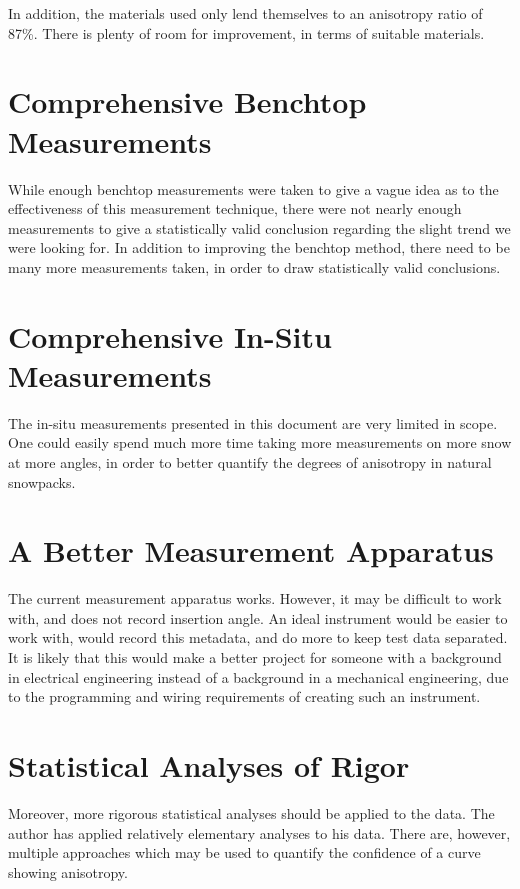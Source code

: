 In addition, the materials used only lend themselves to an anisotropy ratio of
87\%. There is plenty of room for improvement, in terms of suitable materials.

\section{Comprehensive Benchtop Measurements}

While enough benchtop measurements were taken to give a vague idea as to the
effectiveness of this measurement technique, there were not nearly enough
measurements to give a statistically valid conclusion regarding the slight
trend we were looking for. In addition to improving the benchtop method, there
need to be many more measurements taken, in order to draw statistically valid
conclusions.

\section{Comprehensive In-Situ Measurements}

The in-situ measurements presented in this document are very limited in scope.
One could easily spend much more time taking more measurements on more snow at
more angles, in order to better quantify the degrees of anisotropy in natural
snowpacks.

\section{A Better Measurement Apparatus}

The current measurement apparatus works. However, it may be difficult to work
with, and does not record insertion angle. An ideal instrument would be easier
to work with, would record this metadata, and do more to keep test data
separated. It is likely that this would make a better project for someone with a
background in electrical engineering instead of a background in a mechanical
engineering, due to the programming and wiring requirements of creating such an
instrument.

\section{Statistical Analyses of Rigor}

Moreover, more rigorous statistical analyses should be applied to the data. The
author has applied relatively elementary analyses to his data.
There are, however, multiple approaches which may be used to quantify the
confidence of a curve showing anisotropy.


